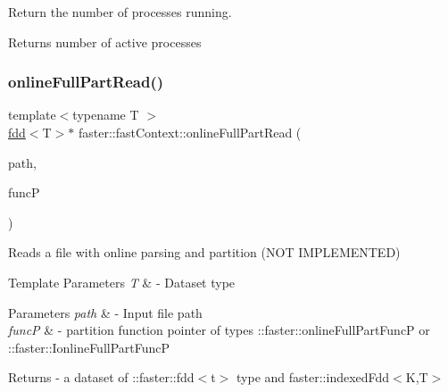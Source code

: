 Return the number of processes running. 

\begin{DoxyReturn}{Returns}
number of active processes 
\end{DoxyReturn}
\hypertarget{classfaster_1_1fastContext_acb65e4cdd0eaae3bf4326247b822e025}{}\label{classfaster_1_1fastContext_acb65e4cdd0eaae3bf4326247b822e025} 
\subsubsection{\texorpdfstring{online\+Full\+Part\+Read()}{onlineFullPartRead()}}
{\footnotesize\ttfamily template$<$typename T $>$ \\
\hyperlink{classfaster_1_1fdd}{fdd}$<$T$>$$\ast$ faster\+::fast\+Context\+::online\+Full\+Part\+Read (\begin{DoxyParamCaption}\item[{std\+::string}]{path,  }\item[{online\+Full\+Part\+FuncP$<$ T $>$}]{funcP }\end{DoxyParamCaption})}



Reads a file with online parsing and partition (N\+OT I\+M\+P\+L\+E\+M\+E\+N\+T\+ED) 


\begin{DoxyTemplParams}{Template Parameters}
{\em T} & -\/ Dataset type \\
\hline
\end{DoxyTemplParams}

\begin{DoxyParams}{Parameters}
{\em path} & -\/ Input file path \\
\hline
{\em funcP} & -\/ partition function pointer of types \+::faster\+::online\+Full\+Part\+FuncP or \+::faster\+::\+Ionline\+Full\+Part\+FuncP\\
\hline
\end{DoxyParams}
\begin{DoxyReturn}{Returns}
-\/ a dataset of \+::faster\+::fdd$<$t$>$ type and faster\+::indexed\+Fdd$<$\+K,\+T$>$ 
\end{DoxyReturn}
\hypertarget{classfaster_1_1fastContext_a8cf960425a7671021854367ea9649546}{}\label{classfaster_1_1fastContext_a8cf960425a7671021854367ea9649546} 
